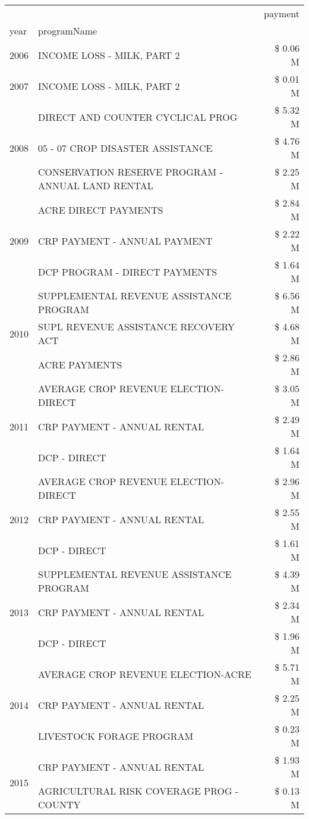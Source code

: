 \begin{tabular}{llr}
\toprule
 &  & payment \\
year & programName &  \\
\midrule
2006 & INCOME LOSS - MILK, PART 2 & \$ 0.06 M \\
\cline{1-3}
2007 & INCOME LOSS - MILK, PART 2 & \$ 0.01 M \\
\cline{1-3}
\multirow[t]{3}{*}{2008} & DIRECT AND COUNTER CYCLICAL PROG & \$ 5.32 M \\
 & 05 - 07 CROP DISASTER ASSISTANCE & \$ 4.76 M \\
 & CONSERVATION RESERVE PROGRAM - ANNUAL LAND RENTAL & \$ 2.25 M \\
\cline{1-3}
\multirow[t]{3}{*}{2009} & ACRE DIRECT PAYMENTS & \$ 2.84 M \\
 & CRP PAYMENT - ANNUAL PAYMENT & \$ 2.22 M \\
 & DCP PROGRAM - DIRECT PAYMENTS & \$ 1.64 M \\
\cline{1-3}
\multirow[t]{3}{*}{2010} & SUPPLEMENTAL REVENUE ASSISTANCE PROGRAM & \$ 6.56 M \\
 & SUPL REVENUE ASSISTANCE RECOVERY ACT & \$ 4.68 M \\
 & ACRE PAYMENTS & \$ 2.86 M \\
\cline{1-3}
\multirow[t]{3}{*}{2011} & AVERAGE CROP REVENUE ELECTION-DIRECT & \$ 3.05 M \\
 & CRP PAYMENT - ANNUAL RENTAL & \$ 2.49 M \\
 & DCP - DIRECT & \$ 1.64 M \\
\cline{1-3}
\multirow[t]{3}{*}{2012} & AVERAGE CROP REVENUE ELECTION-DIRECT & \$ 2.96 M \\
 & CRP PAYMENT - ANNUAL RENTAL & \$ 2.55 M \\
 & DCP - DIRECT & \$ 1.61 M \\
\cline{1-3}
\multirow[t]{3}{*}{2013} & SUPPLEMENTAL REVENUE ASSISTANCE PROGRAM & \$ 4.39 M \\
 & CRP PAYMENT - ANNUAL RENTAL & \$ 2.34 M \\
 & DCP - DIRECT & \$ 1.96 M \\
\cline{1-3}
\multirow[t]{3}{*}{2014} & AVERAGE CROP REVENUE ELECTION-ACRE & \$ 5.71 M \\
 & CRP PAYMENT - ANNUAL RENTAL & \$ 2.25 M \\
 & LIVESTOCK FORAGE PROGRAM & \$ 0.23 M \\
\cline{1-3}
\multirow[t]{3}{*}{2015} & CRP PAYMENT - ANNUAL RENTAL & \$ 1.93 M \\
 & AGRICULTURAL RISK COVERAGE PROG - COUNTY & \$ 0.13 M \\

\end{tabular}
